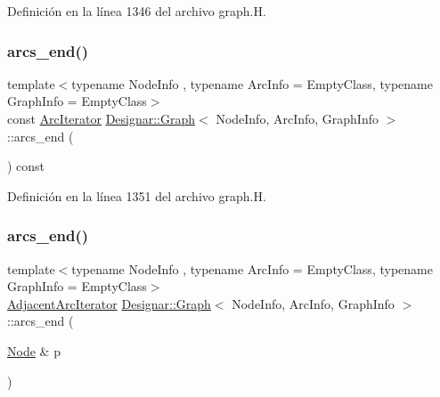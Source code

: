 Definición en la línea 1346 del archivo graph.\+H.

\mbox{\label{class_designar_1_1_graph_a81269c52d854ceb3d000f2642fcb52ae}} 
\subsubsection{\texorpdfstring{arcs\+\_\+end()}{arcs\_end()}\hspace{0.1cm}{\footnotesize\ttfamily [2/4]}}
{\footnotesize\ttfamily template$<$typename Node\+Info , typename Arc\+Info  = Empty\+Class, typename Graph\+Info  = Empty\+Class$>$ \\
const \hyperlink{class_designar_1_1_graph_1_1_arc_iterator}{Arc\+Iterator} \hyperlink{class_designar_1_1_graph}{Designar\+::\+Graph}$<$ Node\+Info, Arc\+Info, Graph\+Info $>$\+::arcs\+\_\+end (\begin{DoxyParamCaption}{ }\end{DoxyParamCaption}) const\hspace{0.3cm}{\ttfamily [inline]}}



Definición en la línea 1351 del archivo graph.\+H.

\mbox{\label{class_designar_1_1_graph_a68ee235ab79790c00e1a69d518b9c076}} 
\subsubsection{\texorpdfstring{arcs\+\_\+end()}{arcs\_end()}\hspace{0.1cm}{\footnotesize\ttfamily [3/4]}}
{\footnotesize\ttfamily template$<$typename Node\+Info , typename Arc\+Info  = Empty\+Class, typename Graph\+Info  = Empty\+Class$>$ \\
\hyperlink{class_designar_1_1_graph_1_1_adjacent_arc_iterator}{Adjacent\+Arc\+Iterator} \hyperlink{class_designar_1_1_graph}{Designar\+::\+Graph}$<$ Node\+Info, Arc\+Info, Graph\+Info $>$\+::arcs\+\_\+end (\begin{DoxyParamCaption}\item[{\hyperlink{class_designar_1_1_graph_a5dfc7dba9d092ac489c72e40390c37d0}{Node} \&}]{p }\end{DoxyParamCaption})\hspace{0.3cm}{\ttfamily [inline]}}



